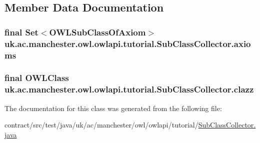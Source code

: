 \subsection{Member Data Documentation}
\hypertarget{classuk_1_1ac_1_1manchester_1_1owl_1_1owlapi_1_1tutorial_1_1_sub_class_collector_af090224a0fe57520bb85c1781b8dd95d}{
\subsubsection[{axioms}]{\setlength{\rightskip}{0pt plus 5cm}final Set$<${\bf O\-W\-L\-Sub\-Class\-Of\-Axiom}$>$ uk.\-ac.\-manchester.\-owl.\-owlapi.\-tutorial.\-Sub\-Class\-Collector.\-axioms\hspace{0.3cm}{\ttfamily [private]}}}\label{classuk_1_1ac_1_1manchester_1_1owl_1_1owlapi_1_1tutorial_1_1_sub_class_collector_af090224a0fe57520bb85c1781b8dd95d}
\hypertarget{classuk_1_1ac_1_1manchester_1_1owl_1_1owlapi_1_1tutorial_1_1_sub_class_collector_a8252997828e01c6f360356998e373061}{
\subsubsection[{clazz}]{\setlength{\rightskip}{0pt plus 5cm}final {\bf O\-W\-L\-Class} uk.\-ac.\-manchester.\-owl.\-owlapi.\-tutorial.\-Sub\-Class\-Collector.\-clazz\hspace{0.3cm}{\ttfamily [private]}}}\label{classuk_1_1ac_1_1manchester_1_1owl_1_1owlapi_1_1tutorial_1_1_sub_class_collector_a8252997828e01c6f360356998e373061}


The documentation for this class was generated from the following file\-:\begin{DoxyCompactItemize}
\item 
contract/src/test/java/uk/ac/manchester/owl/owlapi/tutorial/\hyperlink{_sub_class_collector_8java}{Sub\-Class\-Collector.\-java}\end{DoxyCompactItemize}
